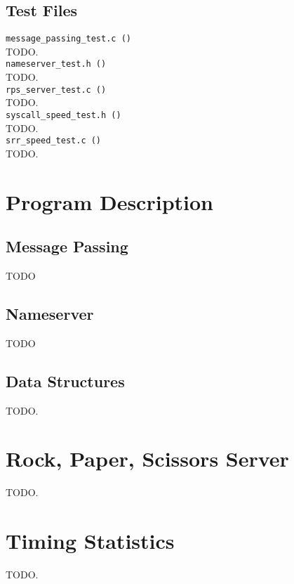 \documentclass[letterpaper]{article}
\begin{document}
\subsection{Test Files}
\verb!message_passing_test.c ()!\\
TODO.\\
\verb!nameserver_test.h ()!\\
TODO.\\
\verb!rps_server_test.c ()!\\
TODO.\\
\verb!syscall_speed_test.h ()!\\
TODO.\\
\verb!srr_speed_test.c ()!\\
TODO.\\

\section{Program Description}

\subsection{Message Passing}

TODO \\

\subsection{Nameserver}

TODO \\

\subsection{Data Structures}

TODO. \\

\section{Rock, Paper, Scissors Server}

TODO. \\

\section{Timing Statistics}

TODO. \\
\end{document}
